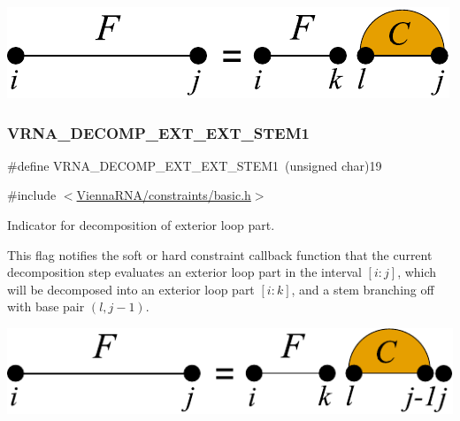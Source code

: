  
\begin{DoxyImageNoCaption}
  \mbox{\includegraphics[width=\textwidth,height=\textheight/2,keepaspectratio=true]{decomp_ext_ext_stem}}
\end{DoxyImageNoCaption}
 \mbox{\label{group__constraints_ga2e75d7a77118735b32f25422d9686719}} 
\subsubsection{\texorpdfstring{V\+R\+N\+A\+\_\+\+D\+E\+C\+O\+M\+P\+\_\+\+E\+X\+T\+\_\+\+E\+X\+T\+\_\+\+S\+T\+E\+M1}{VRNA\_DECOMP\_EXT\_EXT\_STEM1}}
{\footnotesize\ttfamily \#define V\+R\+N\+A\+\_\+\+D\+E\+C\+O\+M\+P\+\_\+\+E\+X\+T\+\_\+\+E\+X\+T\+\_\+\+S\+T\+E\+M1~(unsigned char)19}



{\ttfamily \#include $<$\hyperlink{constraints_2basic_8h}{Vienna\+R\+N\+A/constraints/basic.\+h}$>$}



Indicator for decomposition of exterior loop part. 

This flag notifies the soft or hard constraint callback function that the current decomposition step evaluates an exterior loop part in the interval $[i:j]$, which will be decomposed into an exterior loop part $[i:k]$, and a stem branching off with base pair $(l,j-1)$.

 
\begin{DoxyImageNoCaption}
  \mbox{\includegraphics[width=\textwidth,height=\textheight/2,keepaspectratio=true]{decomp_ext_ext_stem1}}
\end{DoxyImageNoCaption}
 

